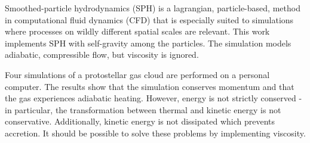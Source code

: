 \documentclass[../main.tex]{subfiles}
\begin{document}
Smoothed-particle hydrodynamics (SPH) is a lagrangian, particle-based, method in
computational fluid dynamics (CFD) that is especially suited to simulations where processes on
wildly different spatial scales are relevant. This work implements SPH with self-gravity among the
particles. The simulation models adiabatic, compressible flow, but viscosity is ignored.

Four simulations of a protostellar gas cloud are performed on a personal computer. The results show
that the simulation conserves momentum and that the gas experiences adiabatic heating. However,
energy is not strictly conserved - in particular, the transformation between thermal and kinetic
energy is not conservative. Additionally, kinetic energy is not dissipated which prevents accretion.
It should be possible to solve these problems by implementing viscosity.
\end{document}

